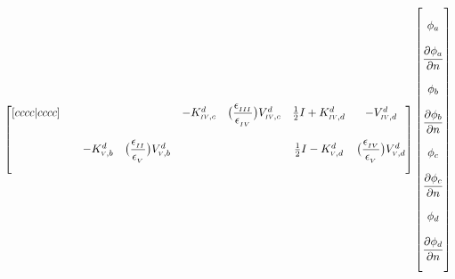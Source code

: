 \documentclass{article}
\newcommand{\RomCap}[1]
    {\MakeUppercase{\scaleto{\romannumeral #1}{3.5pt}}}
\newcommand{\myfrac}[3][0pt]{\genfrac{}{}{}{}{\raisebox{#1}{$#2$}}{\raisebox{-#1}{$#3$}}}
\begin{document}
\begin{equation}
\begin{bmatrix}[cccc|cccc]
	     	 &  &  &  & 

	     	\iffalse
	     	A_{75} &
			\fi
			
			-K^{d}_{\RomCap{4},c} & 	
			
			\iffalse
	     	A_{76} &
			\fi
	     	
	     	\big(\myfrac[3pt]{\epsilon_{_\RomCap{3}}}{\epsilon_{_\RomCap{4}}}\big)V^{d}_{\RomCap{4},c} &
	     	
	     	\iffalse
	     	A_{77} & A_{78} &
			\fi

			\frac{1}{2}I+K^{d}_{\RomCap{4},d} & -V^{d}_{\RomCap{4},d} \\
             &  &  &  &  &  &  & \\
	     	\iffalse
	     	Row 8 : A_{81} & A_{82} &
			\fi
			
			 &  & 	
			
			\iffalse
	     	A_{83} & 
	     	\fi
			
	     	-K^{d}_{\RomCap{5},b} &

			\iffalse
	     	A_{84} &
			\fi

			\big(\myfrac[3pt]{\epsilon_{_\RomCap{2}}}{\epsilon_{_\RomCap{5}}}\big)V^{d}_{\RomCap{5},b} &
			
			\iffalse
	     	A_{85} & A_{86} & 
	     	\fi
			
	     	 &	 &

			\iffalse
	     	A_{87} &
			\fi

			\frac{1}{2}I-K^{d}_{\RomCap{5},d} & 

			\iffalse
	     	A_{88} \\
			\fi

			\big(\myfrac[3pt]{\epsilon_{_\RomCap{4}}}{\epsilon_{_\RomCap{5}}}\big)V^{d}_{\RomCap{5},d}
			\\ \\
	    \end{bmatrix}
	    \begin{bmatrix}
	    \\
	    \phi_{a} \\ \\
	    \myfrac[3pt]{\partial{\phi_{a}}}{\partial{n}} \\ \\ 
	    \phi_{b} \\ \\
	    \myfrac[3pt]{\partial{\phi_{b}}}{\partial{n}} \\ \\
	    \phi_{c} \\ \\
	    \myfrac[3pt]{\partial{\phi_{c}}}{\partial{n}} \\ \\
	    \phi_{d} \\ \\
	    \myfrac[3pt]{\partial{\phi_{d}}}{\partial{n}}\\ \\


\end{bmatrix}
\end{equation}
\end{document}
